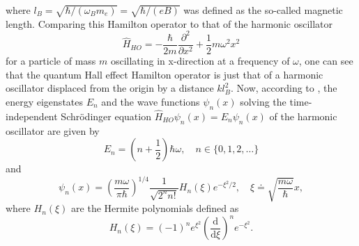 \documentclass{report}
\numberwithin{tm}{section}
\begin{document}
\begin{align}
\begin{aligned}
 \end{aligned}
\end{align} where $l_B = \sqrt{\hbar/(\omega_Bm_e)} = \sqrt{\hbar/(eB)}$ was defined as the so-called magnetic length. Comparing this Hamilton operator to that of the harmonic oscillator \begin{equation}
\hat{H}_{HO} = -\frac{\hbar}{2m}\frac{\partial^2}{\partial x^2} + \frac{1}{2}m\omega^2 x^2
\end{equation} for a particle of mass $m$ oscillating in x-direction at a frequency of $\omega$, one can see that the quantum Hall effect Hamilton operator is just that of a harmonic oscillator displaced from the origin by a distance $kl_B^2$. Now, according to \cite[pp.51-52]{Griffiths.2018}, the energy eigenstates $E_n$ and the wave functions $\psi_n(x)$ solving the time-independent Schrödinger equation $\hat{H}_{HO} \psi_n(x) = E_n\psi_n(x)$ of the harmonic oscillator are given by \begin{equation}
E_n = \left(n + \frac{1}{2}\right)\hbar \omega, \quad n \in \{0,1,2,\dots\}
\end{equation} and
\begin{equation}
	\psi_n(x) = \left(\frac{m\omega}{\pi\hbar}\right)^{1/4}\frac{1}{\sqrt{2^n n!}}H_n(\xi)e^{-\xi^2/2}, \quad \xi \doteq \sqrt{\frac{m\omega}{\hbar}}x,
\end{equation} where $H_n(\xi)$ are the Hermite polynomials defined as \begin{equation}\label{eq:hermitepolynomials}
H_n(\xi) = (-1)^n e^{\xi^2}\left(\frac{\mathrm{d}}{\mathrm{d}\xi}\right)^n e^{-\xi^2}.
\end{equation} 
\end{document}
